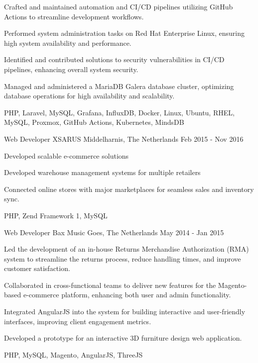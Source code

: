 \begin{cventries}
{\begin{cvitems}
        \item {Crafted and maintained automation and CI/CD pipelines utilizing GitHub Actions to streamline development workflows.}
        \item {Performed system administration tasks on Red Hat Enterprise Linux, ensuring high system availability and performance.}
        \item {Identified and contributed solutions to security vulnerabilities in CI/CD pipelines, enhancing overall system security.}
        \item {Managed and administered a MariaDB Galera database cluster, optimizing database operations for high availability and scalability.}
      \end{cvitems}
    }
    {PHP, Laravel, MySQL, Grafana, InfluxDB, Docker, Linux, Ubuntu, RHEL, MySQL, Proxmox, GitHub Actions, Kubernetes, MindsDB}

\newpage

  \cventry
    {Web Developer} %
    {XSARUS} %
    {Middelharnis, The Netherlands} %
    {Feb 2015 - Nov 2016} %
    {
      \begin{cvitems} %
        \item {Developed scalable e-commerce solutions}
        \item {Developed warehouse management systems for multiple retailers}
        \item {Connected online stores with major marketplaces for seamless sales and inventory sync.  }
      \end{cvitems}
    }
    {PHP, Zend Framework 1, MySQL}

  \cventry
    {Web Developer} %
    {Bax Music} %
    {Goes, The Netherlands} %
    {May 2014 - Jan 2015} %
    {
      \begin{cvitems} %
        \item {Led the development of an in-house Returns Merchandise Authorization (RMA) system to streamline the returns process, reduce handling times, and improve customer satisfaction.}
        \item {Collaborated in cross-functional teams to deliver new features for the Magento-based e-commerce platform, enhancing both user and admin functionality.}
        \item {Integrated AngularJS into the system for building interactive and user-friendly interfaces, improving client engagement metrics.}
        \item {Developed a prototype for an interactive 3D furniture design web application.}
      \end{cvitems}
    }
    {PHP, MySQL, Magento, AngularJS, ThreeJS}


\end{cventries}
